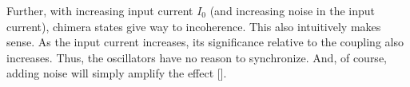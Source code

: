 Further, with increasing input current $I_{0}$ (and increasing noise in the input current), chimera states give way to incoherence.
This also intuitively makes sense.
As the input current increases, its significance relative to the coupling also increases.
Thus, the oscillators have no reason to synchronize.
And, of course, adding noise will simply amplify the effect [].

